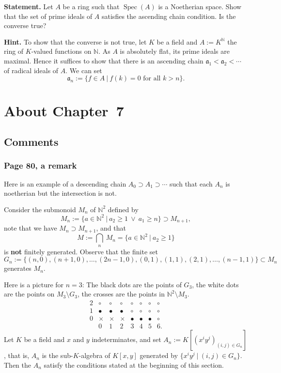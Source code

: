 \documentclass[12pt,letterpaper]{article}%
\newcommand{\mf}{\mathfrak}
\newcommand{\aaa}{\mf a}
\newcommand{\Spec}{\operatorname{Spec}}\newcommand{\Sp}{\operatorname{Spec}}
\newcommand{\nn}{\noindent}
\begin{document}
\textbf{Statement.} Let $A$ be a ring such that $\Spec(A)$ is a Noetherian space. Show that the set of prime ideals of $A$ satisfies the ascending chain condition. Is the converse true?

\nn\textbf{Hint.} To show that the converse is not true, let $K$ be a field and $A:=K^{\mathbb N}$ the ring of $K$-valued functions on $\mathbb N$. As $A$ is absolutely flat, its prime ideals are maximal. Hence it suffices to show that there is an ascending chain $\aaa_1<\aaa_2<\cdots$ of radical ideals of $A$. We can set 
$$
\aaa_n:=\{f\in A\ |\ f(k)=0\text{ for all }k>n\}.
$$

\newpage

\section{About Chapter~7}%

\subsection{Comments}%

\subsubsection{Page 80, a remark}%

Here is an example of a descending chain $A_0\supset A_1\supset\cdots$ such that each $A_n$ is noetherian but the intersection is not.

Consider the submonoid $M_n$ of $\mathbb N^2$ defined by 
$$
M_n:=\{a\in\mathbb N^2\ |\ a_2\ge1\ \lor\ a_1\ge n\}\supset M_{n+1},
$$ 
note that we have $M_n\supset M_{n+1}$, and that 
$$
M:=\bigcap_n\ M_n=\{a\in\mathbb N^2\ |\ a_2\ge1\}
$$ 
is \textbf{not} finitely generated. Observe that the finite set 
$$
G_n:=\{(n,0),(n+1,0),\dots,(2n-1,0),(0,1),(1,1),(2,1),\dots,(n-1,1)\}\subset M_n
$$ 
generates $M_n$. 

Here is a picture for $n=3$: The black dots are the points of $G_3$, the white dots are the points on $M_3\setminus G_3$, the crosses are the points in $\mathbb N^2\setminus M_3$.
$$
\begin{matrix}
2&\circ&\circ&\circ&\circ&\circ&\circ&\circ\\ 
1&\bullet&\bullet&\bullet&\circ&\circ&\circ&\circ\\ 
0&\times&\times&\times&\bullet&\bullet&\bullet&\circ\\ 
&0&1&2&3&4&5&6.
\end{matrix}
$$
Let $K$ be a field and $x$ and $y$ indeterminates, and set $A_n:=K[(x^iy^j)_{(i,j)\in G_n}]$, that is, $A_n$ is the sub-$K$-algebra of $K[x,y]$ generated by $\{x^iy^j\ |\ (i,j)\in G_n\}$. Then the $A_n$ satisfy the conditions stated at the beginning of this section.
\end{document}
